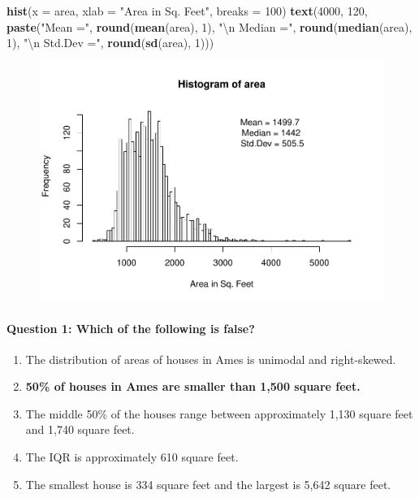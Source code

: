 \documentclass[]{article}
\newenvironment{Shaded}{\begin{snugshade}}{\end{snugshade}}
\newcommand{\KeywordTok}[1]{\textcolor[rgb]{0.13,0.29,0.53}{\textbf{{#1}}}}
\newcommand{\DataTypeTok}[1]{\textcolor[rgb]{0.13,0.29,0.53}{{#1}}}
\newcommand{\DecValTok}[1]{\textcolor[rgb]{0.00,0.00,0.81}{{#1}}}
\newcommand{\CharTok}[1]{\textcolor[rgb]{0.31,0.60,0.02}{{#1}}}
\newcommand{\StringTok}[1]{\textcolor[rgb]{0.31,0.60,0.02}{{#1}}}
\newcommand{\NormalTok}[1]{{#1}}
\begin{document}
\begin{Shaded}
\begin{Highlighting}[]
\KeywordTok{hist}\NormalTok{(}\DataTypeTok{x =} \NormalTok{area, }\DataTypeTok{xlab =} \StringTok{"Area in Sq. Feet"}\NormalTok{, }\DataTypeTok{breaks =} \DecValTok{100}\NormalTok{)}
\KeywordTok{text}\NormalTok{(}\DecValTok{4000}\NormalTok{, }\DecValTok{120}\NormalTok{, }\KeywordTok{paste}\NormalTok{(}\StringTok{"Mean ="}\NormalTok{, }\KeywordTok{round}\NormalTok{(}\KeywordTok{mean}\NormalTok{(area), }\DecValTok{1}\NormalTok{), }\StringTok{"}\CharTok{\textbackslash{}n}\StringTok{ Median ="}\NormalTok{, }
         \KeywordTok{round}\NormalTok{(}\KeywordTok{median}\NormalTok{(area), }\DecValTok{1}\NormalTok{), }\StringTok{"}\CharTok{\textbackslash{}n}\StringTok{ Std.Dev ="}\NormalTok{, }\KeywordTok{round}\NormalTok{(}\KeywordTok{sd}\NormalTok{(area), }\DecValTok{1}\NormalTok{)))}
\end{Highlighting}
\end{Shaded}

\begin{figure}[htbp]
\centering
\includegraphics{Lab3A_files/figure-latex/ExploreData-1.pdf}
\caption{}
\end{figure}

\paragraph{Question 1: Which of the following is
false?}\label{question-1-which-of-the-following-is-false}

\begin{enumerate}
\def\labelenumi{\Alph{enumi})}
\itemsep1pt\parskip0pt
\item
  The distribution of areas of houses in Ames is unimodal and
  right-skewed.
\item
  \textbf{50\% of houses in Ames are smaller than 1,500 square feet.}
\item
  The middle 50\% of the houses range between approximately 1,130 square
  feet and 1,740 square feet.
\item
  The IQR is approximately 610 square feet.
\item
  The smallest house is 334 square feet and the largest is 5,642 square
  feet.
\end{enumerate}
\end{document}
